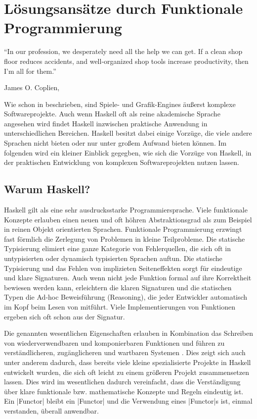 \chapter{Lösungsansätze durch Funktionale Programmierung}\label{chap:loesungen-durch-fp}

\epigraph{"`In our profession, we desperately need all the help we can get. If a clean shop floor reduces accidents, and well-organized shop tools increase productivity, then I’m all for them."'}{James O. Coplien, }

Wie schon in  beschrieben, sind Spiele- und Grafik-Engines äußerst komplexe Softwareprojekte. Auch wenn Haskell oft als reine akademische Sprache angesehen wird findet Haskell inzwischen praktische Anwendung in unterschiedlichen Bereichen. Haskell besitzt dabei einige Vorzüge, die viele andere Sprachen nicht bieten oder nur unter großem Aufwand bieten können. Im folgenden wird ein kleiner Einblick gegegben, wie sich die Vorzüge von Haskell, in der praktischen Entwicklung von komplexen Softwareprojekten nutzen lassen.

\section{Warum Haskell?}\label{sec:warum-haskell}
Haskell gilt als eine sehr ausdrucksstarke Programmiersprache. Viele funktionale Konzepte erlauben einen neuen und oft höhren Abstraktionsgrad als zum Beispiel in reinen Objekt orientierten Sprachen. Funktionale Programmierung erzwingt fast förmlich die Zerlegung von Problemen in kleine Teilprobleme. Die statische Typisierung elimiert eine ganze Kategorie von Fehlerquellen, die sich oft in untypisierten oder dynamisch typisierten Sprachen auftun. Die statische Typisierung und das Fehlen von implizieten Seiteneffekten sorgt für eindeutige und klare Signaturen. Auch wenn nicht jede Funktion formal auf ihre Korrektheit bewiesen werden kann, erleichtern die klaren Signaturen und die statischen Typen die Ad-hoc Beweisführung (Reasoning), die jeder Entwickler automatisch im Kopf beim Lesen von mitführt. Viele Implementierungen von Funktionen ergeben sich oft schon aus der Signatur.

Die genannten wesentlichen Eigenschaften erlauben in Kombination das Schreiben von wiederverwendbaren und komponierbaren Funktionen und führen zu verständlicheren, zugänglicheren und wartbaren Systemen \parencite[Seite 12 ff.]{Stewart2015}. Dies zeigt sich auch unter anderem dadurch, dass bereits viele kleine spezialisierte Projekte in Haskell entwickelt wurden, die sich oft leicht zu einem größeren Projekt zusammensetzen lassen. Dies wird im wesentlichen dadurch vereinfacht, dass die Verständigung über klare funktionale bzw. mathematische Konzepte und Regeln eindeutig ist. Ein |Functor| bleibt ein |Functor| und die Verwendung eines |Functor|s ist, einmal verstanden, überall anwendbar.
\cite{Sweeney2006} %

